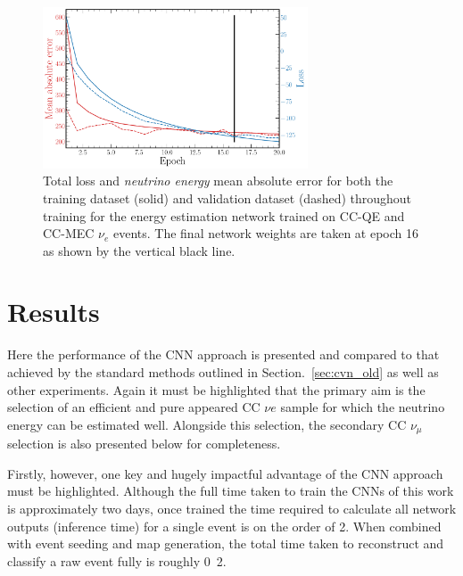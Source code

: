 \begin{figure} %
    \includegraphics[width=0.7\textwidth]{diagrams/6-cvn/chipsnet/final_energy_history.pdf}
    \caption[Loss and mean absolute error throughout training for the beam classification network.]
    {Total loss and \emph{neutrino energy} mean absolute error for both the training dataset
        (solid) and validation dataset (dashed) throughout training for the energy estimation
        network trained on CC-QE and CC-MEC $\nu_{e}$ events. The final network weights are taken
        at epoch 16 as shown by the vertical black line.}
    \label{fig:final_energy_history}
\end{figure}

\section{Results} %
\label{sec:cvn_results} %

Here the performance of the CNN approach is presented and compared to that achieved by the
standard \chips methods outlined in Section.~\ref{sec:cvn_old} as well as other experiments. Again
it must be highlighted that the primary aim is the selection of an efficient and pure appeared CC
$\nu{e}$ sample for which the neutrino energy can be estimated well. Alongside this selection, the
secondary CC $\nu_{\mu}$ selection is also presented below for completeness.

Firstly, however, one key and hugely impactful advantage of the CNN approach must be highlighted.
Although the full time taken to train the CNNs of this work is approximately two days, once
trained the time required to calculate all network outputs (inference time) for a single event is
on the order of \unit{2}{}. When combined with event seeding and map generation, the
total time taken to reconstruct and classify a raw event fully is roughly
\unit{0.2}{}.

